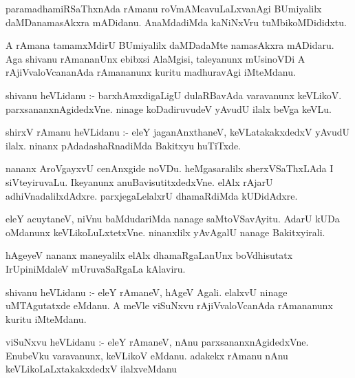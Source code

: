 \documentclass{article}
\begin{document}
\begin{mn}
paramadhamiRSaThxnAda  rAmanu  roVmAMcavuLaLxvanAgi  BUmiyalilx  daMDanamasAkxra mADidanu.  AnaMdadiMda  kaNiNxVru  tuMbikoMDididxtu.
\end{mn}

\begin{mn}
A  rAmana  tamamxMdirU  BUmiyalilx  daMDadaMte  namasAkxra  mADidaru.  Aga  shivanu  rAmananUnx  ebibxsi  AlaMgisi,  taleyanunx  
mUsinoVDi  A  rAjiVvaloVcananAda  rAmananunx  kuritu  madhuravAgi  iMteMdanu.
\end{mn}

\begin{mn}
shivanu  heVLidanu :- barxhAmxdigaLigU  dulaRBavAda  varavanunx  keVLikoV.  parxsananxnAgidedxVne.  ninage  koDadiruvudeV  yAvudU  
ilalx  beVga  keVLu.
\end{mn}

\begin{mn}
shirxV  rAmanu  heVLidanu :- eleY  jaganAnxthaneV,  keVLatakakxdedxV  yAvudU  ilalx.  ninanx  pAdadashaRnadiMda  Bakitxyu  huTiTxde.  
\end{mn}

\begin{mn}
nananx  AroVgayxvU  cenAnxgide  noVDu.  heMgasaralilx  sherxVSaThxLAda  I  siVteyiruvaLu.  Ikeyanunx  anuBavisutitxdedxVne.  
elAlx  rAjarU  adhiVnadalilxdAdxre.  parxjegaLelalxrU  dhamaRdiMda  kUDidAdxre.
\end{mn}

\begin{mn}
eleY  acuytaneV,  niVnu  baMdudariMda  nanage  saMtoVSavAyitu.  AdarU  kUDa  oMdanunx  keVLikoLuLxtetxVne.  ninanxlilx  yAvAgalU  
nanage  Bakitxyirali.
\end{mn}

\begin{mn}
hAgeyeV  nananx  maneyalilx  elAlx  dhamaRgaLanUnx  boVdhisutatx  IrUpiniMdaleV  mUruvaSaRgaLa  kAlaviru.
\end{mn}

\begin{mn}
shivanu  heVLidanu :- eleY  rAmaneV, hAgeV  Agali.  elalxvU  ninage  uMTAgutatxde  eMdanu.  A  meVle  viSuNxvu  rAjiVvaloVcanAda  
rAmananunx  kuritu  iMteMdanu.
\end{mn}

\begin{mn}
viSuNxvu  heVLidanu :- eleY  rAmaneV,  nAnu  parxsananxnAgidedxVne.  EnubeVku  varavanunx,  keVLikoV  eMdanu.  adakekx  rAmanu  nAnu  
keVLikoLaLxtakakxdedxV  ilalxveMdanu
\end{mn}
\end{document}
